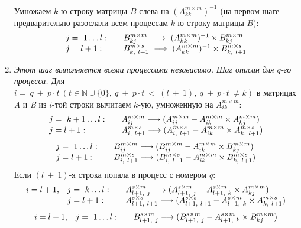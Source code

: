 \documentclass[14pt,a4paper, openany]{article}
\begin{document}
\begin{enumerate}
$$	$$
	Умножаем $k$-ю строку матрицы $B$ слева на $(A_{kk}^{m \times m})^{-1}$ (на первом шаге предварительно разослали всем процессам $k$-ю строку матрицы $B$):
	$$
	\begin{array}{l l}
		j =\ 1 \ldots l:
		& \quad B_{kj}^{m \times m} \ \longrightarrow \ (A_{kk}^{m \times m})^{-1} \times B_{kj}^{m \times m} \\
		j = l+1:  &  \quad B_{k,\ l+1}^{m \times s} \ \longrightarrow \ (A_{kk}^{m \times m})^{-1} \times B_{k,\ l+1}^{m \times s}
	\end{array}
	$$
	\item 
	\textit{Этот шаг выполняется всеми процессами независимо. Шаг описан для $q$-го процесса.}
	Для $i =\ q\ +\ p\cdot t\ (t \in \mathbb{N}\cup \{ 0\},\ q\ +\ p\cdot t\ <\ (l\ +\ 1),\ q\ +\ p\cdot t\ \neq k)$ в матрицах \textit{A} и \textit{B} из $i$-той строки 
	вычитаем $k$-ую, умноженную на $A _{ik}^{m \times m}$: \\
	$$
	\begin{array}{l l}
	 j =\ k+1 \ldots l:
	 & \quad A _{ij}^{m \times m} \longrightarrow (A _{ij}^{m \times m} - A _{ik}^{m \times m} \times  A _{kj}^{m \times m}) \\
	 j = l+1:  &  \quad A _{i,\ l+1}^{m \times s} \longrightarrow (A _{i,\ l+1}^{m \times s} - A _{ik}^{m \times m} \times  A _{k,\ l+1}^{m \times s})
	\end{array}
	$$
	$$
	\begin{array}{l l}
	j =\ 1 \ldots l:
	  	& \quad B _{ij}^{m \times m} \longrightarrow (B _{ij}^{m \times m} - A _{ik}^{m \times m} \times  B _{kj}^{m \times m}) \\
	j = l+1:  
		&  \quad B _{i,\ l+1}^{m \times s} \longrightarrow (B _{i,\ l+1}^{m \times s} - A _{ik}^{m \times m} \times  B _{k,\ l+1}^{m \times s})
	\end{array}
	$$
	Если $(l\ +\ 1)$-я строка попала в процесс с номером $q$:\\ 
	$$
	\begin{array}{l l l}
		i = l+1, &  j =\ k \ldots l:
	  & \quad A _{l+1,\ j}^{s \times m} \longrightarrow (A _{l+1,\ j}^{s \times m} - A _{l+1,\ k}^{s \times m} \times  A _{kj}^{m \times m}) \\
	 & j = l+1:  & \quad A _{l+1,\ l+1}^{s \times s} \longrightarrow (A _{l+1,\ l+1}^{s \times s} - A _{l+1,\ k}^{s \times m} \times  A _{k,\ l+1}^{m \times s})
	\end{array}
	$$
	$$
	\begin{array}{l l l}
	i = l+1, &  j =\ 1 \ldots l:
	  & \quad B _{l+1,\ j}^{s \times m} \longrightarrow (B _{l+1,\ j}^{s \times m} - A _{l+1,\ k}^{s \times m} \times  B _{kj}^{m \times m}) \\

\end{array}$$
\end{enumerate}
\end{document}
